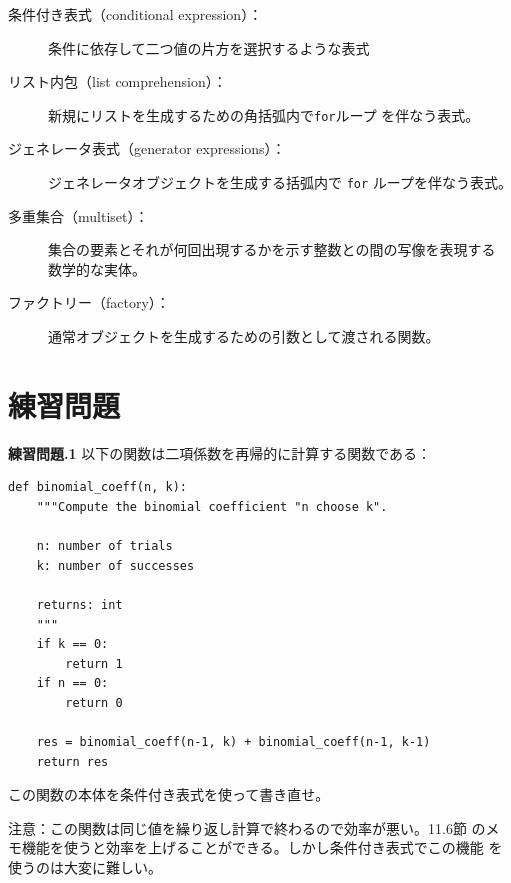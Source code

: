 \documentclass[a4j,12pt,makeidx]{jbook}
\newcommand{\tp}{\thechapter}
\begin{document}
\begin{description}

\item[条件付き表式（conditional expression）：] 条件に依存して二つ値の片方を選択するような表式

\item[リスト内包（list comprehension）：] 新規にリストを生成するための角括弧内で{\tt for}ループ
を伴なう表式。

\item[ジェネレータ表式（generator expressions）：] ジェネレータオブジェクトを生成する括弧内で {\tt for}
ループを伴なう表式。 

\item[多重集合（multiset）：] 集合の要素とそれが何回出現するかを示す整数との間の写像を表現する
数学的な実体。

\item[ファクトリー（factory）：] 通常オブジェクトを生成するための引数として渡される関数。

\end{description}
%
\section{練習問題}
\noindent
{\bf 練習問題\tp.1} 以下の関数は二項係数を再帰的に計算する関数である：
\begin{verbatim}
def binomial_coeff(n, k):
    """Compute the binomial coefficient "n choose k".

    n: number of trials
    k: number of successes

    returns: int
    """
    if k == 0:
        return 1
    if n == 0:
        return 0

    res = binomial_coeff(n-1, k) + binomial_coeff(n-1, k-1)
    return res
\end{verbatim}
この関数の本体を条件付き表式を使って書き直せ。\par
注意：この関数は同じ値を繰り返し計算で終わるので効率が悪い。11.6節
のメモ機能を使うと効率を上げることができる。しかし条件付き表式でこの機能
を使うのは大変に難しい。
%
\appendix
%
\end{document}
